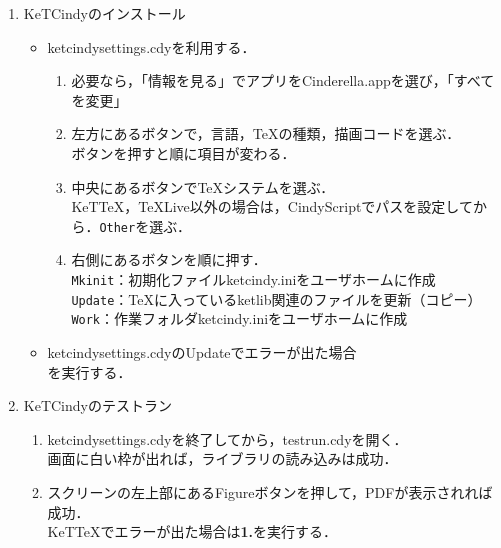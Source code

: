 \documentclass{ujarticle}
\begin{document}
\begin{enumerate}[\bf\large 1.]
\item KeTCindyのインストール
\begin{itemize}
\item ketcindysettings.cdyを利用する．
\begin{enumerate}[(1)]
\item 必要なら，「情報を見る」でアプリをCinderella.appを選び，「すべてを変更」
\item 左方にあるボタンで，言語，TeXの種類，描画コードを選ぶ．\\
\hspace*{10mm}ボタンを押すと順に項目が変わる．
\item 中央にあるボタンでTeXシステムを選ぶ．\\
\hspace*{10mm}KeTTeX，TeXLive以外の場合は，CindyScriptでパスを設定してから．\verb|Other|を選ぶ．
\item 右側にあるボタンを順に押す．\\
\hspace*{10mm}\verb|Mkinit|：初期化ファイルketcindy.iniをユーザホームに作成\\
\hspace*{10mm}\verb|Update|：TeXに入っているketlib関連のファイルを更新（コピー）\\
\hspace*{10mm}\verb|Work|：作業フォルダketcindy.iniをユーザホームに作成
\end{enumerate}
\item ketcindysettings.cdyのUpdateでエラーが出た場合\\
\hspace*{10mm}{\bf 1.}を実行する．
\end{itemize}

  \item KeTCindyのテストラン
    \begin{enumerate}[(1)]
    \item ketcindysettings.cdyを終了してから，testrun.cdyを開く．\\
      \hspace*{10mm}画面に白い枠が出れば，ライブラリの読み込みは成功．
    \item スクリーンの左上部にあるFigureボタンを押して，PDFが表示されれば成功．\\
\hspace*{10mm}KeTTeXでエラーが出た場合は{\bf 1.}を実行する．
\end{enumerate}


\end{enumerate}
\end{document}
